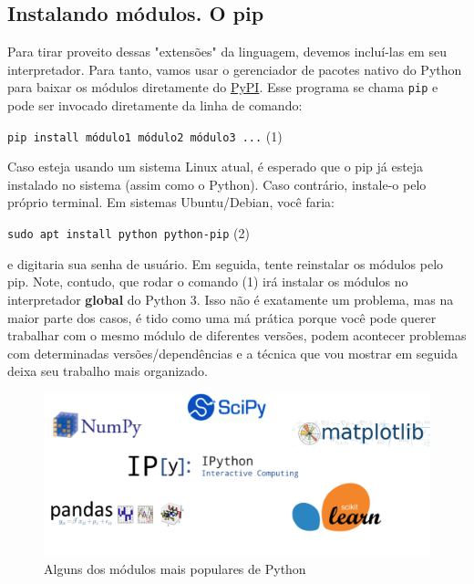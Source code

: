 \documentclass{article}
\begin{document}
	\subsection{Instalando módulos. O pip}

	Para tirar proveito dessas "extensões" da linguagem, devemos incluí-las em seu interpretador. Para tanto, vamos usar
	o gerenciador de pacotes nativo do Python para baixar os módulos diretamente do \href{https://pypi.org/}{PyPI}.
	Esse programa se chama \texttt{pip} e pode ser invocado diretamente da linha de comando: 

	\vspace{1ex}
	\texttt{pip install módulo1 módulo2 módulo3 ...} (1)
	\vspace{1ex} 

	Caso esteja usando um sistema Linux atual, é esperado que o pip já esteja instalado no sistema (assim como o Python). 
	Caso contrário, instale-o pelo próprio terminal. Em sistemas Ubuntu/Debian, você faria: 

	\vspace{1ex} 
	\texttt{sudo apt install python python-pip} (2)
	\vspace{1ex} 

	e digitaria sua senha de usuário. Em seguida, tente reinstalar os módulos pelo pip. Note, contudo, que rodar o comando 
	(1) irá instalar os módulos no interpretador \textbf{global} do Python 3. Isso não é exatamente um problema, mas na maior 
	parte dos casos, é tido como uma má prática porque você pode querer trabalhar com o mesmo módulo de diferentes versões,
	podem acontecer problemas com determinadas versões/dependências e a técnica que vou mostrar em seguida deixa seu trabalho
	mais organizado. 

	\begin{figure}[ht!]
  		\centering
		\includegraphics[scale=0.3]{figs/modules.png} 
  		\caption*{Alguns dos módulos mais populares de Python}
	\end{figure}
\end{document}
